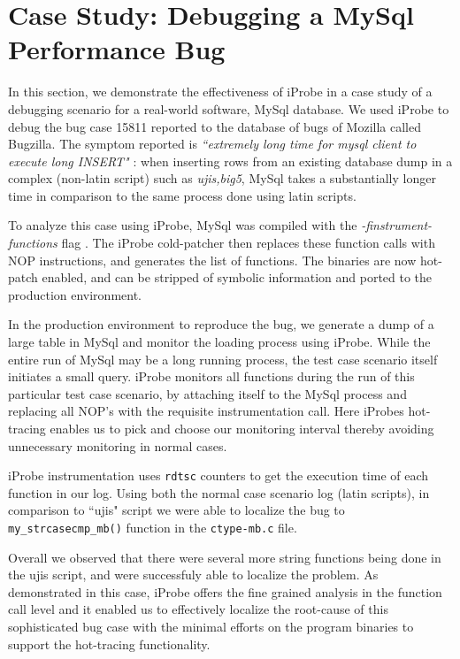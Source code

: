 \section{Case Study: Debugging a MySql Performance Bug}
\label{sec:casestudy}

In this section, we demonstrate the effectiveness of iProbe in a case
study of a debugging scenario for a real-world software, MySql
database.
 We used iProbe to debug the bug case 15811 reported to the database
 of bugs of Mozilla called Bugzilla. 
 The symptom reported is \emph{``extremely long time for mysql client to execute long INSERT"} : 
 when inserting rows from an existing database dump in a complex (non-latin script) such as \textit{ujis,big5}, MySql takes a substantially longer time in comparison to the same process done using latin scripts. 

To analyze this case using iProbe, MySql was compiled with the
\textit{-finstrument-functions} flag \cite{gcc_codegen}.
The iProbe cold-patcher then replaces these function calls with NOP
instructions, and generates the list of functions. 
The binaries are now hot-patch enabled, and can be stripped of symbolic information and ported to the production environment.

In the production environment to reproduce the bug, we generate a dump of a large table in MySql and monitor the loading process using iProbe. 
While the entire run of MySql may be a long running process, the test case scenario itself initiates a small query. 
iProbe monitors all functions during the run of this particular test
case scenario, by attaching itself to the MySql process and replacing all NOP's with the requisite instrumentation call. 
Here iProbes hot-tracing enables us to pick and choose our monitoring interval thereby avoiding unnecessary monitoring in normal cases. 

iProbe instrumentation uses \texttt{rdtsc} counters to get the execution time of each function in our log. 
Using both the normal case scenario log (latin scripts), in comparison
to ``ujis" script we were able to localize the bug to
\texttt{my\_strcasecmp\_mb()} function in the \texttt{ctype-mb.c} file. 

Overall we observed that there were several more string functions being done in the ujis script, and were successfuly able to localize the problem. 
%
As demonstrated in this case, iProbe offers the fine grained analysis
in the function call level and it enabled us to effectively localize
the root-cause of this sophisticated bug case with the minimal efforts
on the program binaries to support the hot-tracing functionality.



